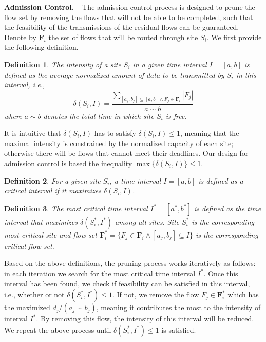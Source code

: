 \documentclass{article}
\newtheorem{definition}{Definition}
\newcommand{\bpara}[2]{\noindent\textbf{#1~~}{#2}}
\begin{document}
\bpara{Admission Control.}
The admission control process is designed to prune the flow set by removing the flows that will not be able to be completed, such that the feasibility of the transmissions of the residual flows can be guaranteed. Denote by $\mathbf{F}_i$ the set of flows that will be routed through site $S_i$. We first provide the following definition.
\begin{definition}
The intensity of a site $S_i$ in a given time interval $I = [a, b]$ is defined as the average normalized amount of data to be transmitted by $S_i$ in this interval, i.e.,
\begin{equation}
\delta(S_i, I) = \frac{\sum_{[a_j, b_j] \subseteq{[a, b]} \wedge F_j \in \mathbf{F}_i} |F_j|}{a \sim b}
\end{equation}
where $a \sim b$ denotes the total time in which site $S_i$ is free.
\end{definition}

It is intuitive that $\delta(S_i, I)$ has to satisfy $\delta(S_i, I) \le 1$, meaning that the maximal intensity is constrained by the normalized capacity of each site; otherwise there will be flows that cannot meet their deadlines. Our design for admission control is based the inequality $\max\{\delta(S_i, I)\} \le 1$.

\begin{definition}
For a given site $S_i$, a time interval $I = [a, b]$ is defined as a critical interval if it maximizes $\delta(S_i, I)$.
\end{definition}

\begin{definition}
The most critical time interval $I^* = [a^*, b^*]$ is defined as the time interval that maximizes $\delta(S_i^*, I^*)$ among all sites. Site $S_i^*$ is the corresponding most critical site and flow set $\mathbf{F}_i^* = \{F_j \in \mathbf{F}_i \wedge [a_j, b_j] \subseteq I\}$ is the corresponding critical flow set.
\end{definition}

Based on the above definitions, the pruning process works iteratively as follows: in each iteration we search for the most critical time interval $I^*$. Once this interval has been found, we check if feasibility can be satisfied in this interval, i.e., whether or not $\delta(S_i^*, I^*) \le 1$. If not, we remove the flow $F_j \in \mathbf{F}_i^*$ which has the maximized $d_j / (a_j \sim b_j)$, meaning it contributes the most to the intensity of interval $I^*$. By removing this flow, the intensity of this interval will be reduced. We repeat the above process until $\delta(S_i^*, I^*) \le 1$ is satisfied.
\end{document}

